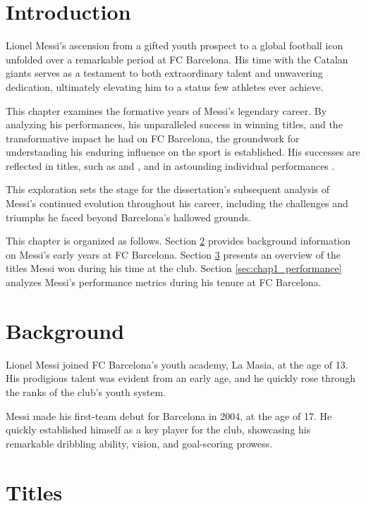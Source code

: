 
\section{Introduction}\label{sec:chap1_intro}
 
Lionel Messi's ascension from a gifted youth prospect to a global football icon 
unfolded over a remarkable period at FC Barcelona.
His time with the Catalan giants serves as a testament to both extraordinary 
talent and unwavering dedication, ultimately elevating him to a status few 
athletes ever achieve. 

This chapter examines the formative years of Messi's legendary career.
By analyzing his performances, his unparalleled success in winning titles, and 
the transformative impact he had on FC Barcelona, the groundwork for 
understanding his enduring influence on the sport is established.
His successes are reflected in titles, such as \textcite{messi2011ucl} 
and \textcite{messi2015ucl}, and in astounding individual performances
\parencite[e.g,][]{messi2009clasico}.

This exploration sets the stage for the dissertation's subsequent analysis of 
Messi's continued evolution throughout his career, 
including the challenges and triumphs he faced beyond Barcelona's hallowed grounds. 

This chapter is organized as follows. 
Section \ref{sec:chap1_background} provides background information on Messi's 
early years at FC Barcelona.
Section \ref{sec:chap1_titles} presents an overview of the titles Messi won 
during his time at the club.
Section \ref{sec:chap1_performance} analyzes Messi's performance metrics during 
his tenure at FC Barcelona.

\section{Background}\label{sec:chap1_background}

Lionel Messi joined FC Barcelona's youth academy, La Masia, at the age of 13.
His prodigious talent was evident from an early age, and he quickly rose through
the ranks of the club's youth system.

Messi made his first-team debut for Barcelona in 2004, at the age of 17.
He quickly established himself as a key player for the club, showcasing his
remarkable dribbling ability, vision, and goal-scoring prowess.

\section{Titles}\label{sec:chap1_titles}

